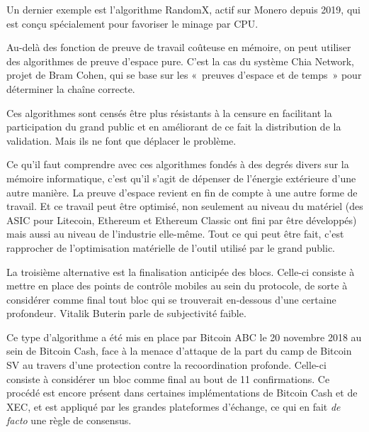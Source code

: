 Un dernier exemple est l'algorithme RandomX, actif sur Monero depuis 2019, qui est conçu spécialement pour favoriser le minage par CPU.

Au-delà des fonction de preuve de travail coûteuse en mémoire, on peut utiliser des algorithmes de preuve d'espace pure. C'est la cas du système Chia Network, projet de Bram Cohen, qui se base sur les «~preuves d'espace et de temps~» pour déterminer la chaîne correcte.

Ces algorithmes sont censés être plus résistants à la censure en facilitant la participation du grand public et en améliorant de ce fait la distribution de la validation. Mais ils ne font que déplacer le problème.

Ce qu'il faut comprendre avec ces algorithmes fondés à des degrés divers sur la mémoire informatique, c'est qu'il s'agit de dépenser de l'énergie extérieure d'une autre manière. La preuve d'espace revient en fin de compte à une autre forme de travail. Et ce travail peut être optimisé, non seulement au niveau du matériel (des ASIC pour Litecoin, Ethereum et Ethereum Classic ont fini par être développés) mais aussi au niveau de l'industrie elle-même. Tout ce qui peut être fait, c'est rapprocher de l'optimisation matérielle de l'outil utilisé par le grand public.


La troisième alternative est la finalisation anticipée des blocs. Celle-ci consiste à mettre en place des points de contrôle mobiles au sein du protocole, de sorte à considérer comme final tout bloc qui se trouverait en-dessous d'une certaine profondeur. Vitalik Buterin parle de subjectivité faible.

Ce type d'algorithme a été mis en place par Bitcoin ABC le 20 novembre 2018 au sein de Bitcoin Cash, face à la menace d'attaque de la part du camp de Bitcoin SV au travers d'une protection contre la recoordination profonde. Celle-ci consiste à considérer un bloc comme final au bout de 11 confirmations. Ce procédé est encore présent dans certaines implémentations de Bitcoin Cash et de XEC, et est appliqué par les grandes plateformes d'échange, ce qui en fait \emph{de facto} une règle de consensus. %

